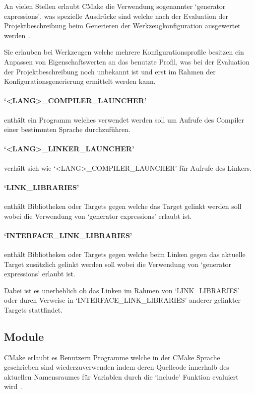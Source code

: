 \documentclass[german,proseminar,hyperref,utf8]{zihpub}
\begin{document}
    An vielen Stellen erlaubt CMake die Verwendung sogenannter `generator expressions', was spezielle
    Ausdrücke sind welche nach der Evaluation der Projektbeschreibung beim Generieren der Werkzeugkonfiguration
    ausgewertet werden~.

    Sie erlauben bei Werkzeugen welche mehrere Konfigurationsprofile besitzen ein Anpassen von
    Eigenschaftswerten an das benutzte Profil, was bei der Evaluation der Projektbeschreibung
    noch unbekannt ist und erst im Rahmen der Konfigurationsgenerierung ermittelt werden kann.

    \paragraph{`<LANG>\_COMPILER\_LAUNCHER'} enthält ein Programm welches verwendet werden soll um
    Aufrufe des Compiler einer bestimmten Sprache durchzuführen.

    \paragraph{`<LANG>\_LINKER\_LAUNCHER'} verhält sich wie `<LANG>\_COMPILER\_LAUNCHER' für Aufrufe des Linkers.

    \paragraph{`LINK\_LIBRARIES'} enthält Bibliotheken oder Targets gegen welche das Target gelinkt
    werden soll wobei die Verwendung von `generator expressions' erlaubt ist.

    \paragraph{`INTERFACE\_LINK\_LIBRARIES'} enthält Bibliotheken oder Targets gegen welche beim Linken
    gegen das aktuelle Target zusätzlich gelinkt werden soll wobei die Verwendung von
    `generator expressions' erlaubt ist.

    Dabei ist es unerheblich ob das Linken im Rahmen von `LINK\_LIBRARIES' oder durch Verweise
    in `INTERFACE\_LINK\_LIBRARIES' anderer gelinkter Targets stattfindet.

    \subsection{Module}
    CMake erlaubt es Benutzern Programme welche in der CMake Sprache geschrieben sind wiederzuverwenden
    indem deren Quellcode innerhalb des aktuellen Namensraumes für Variablen durch die `include'
    Funktion evaluiert wird~.
\end{document}

